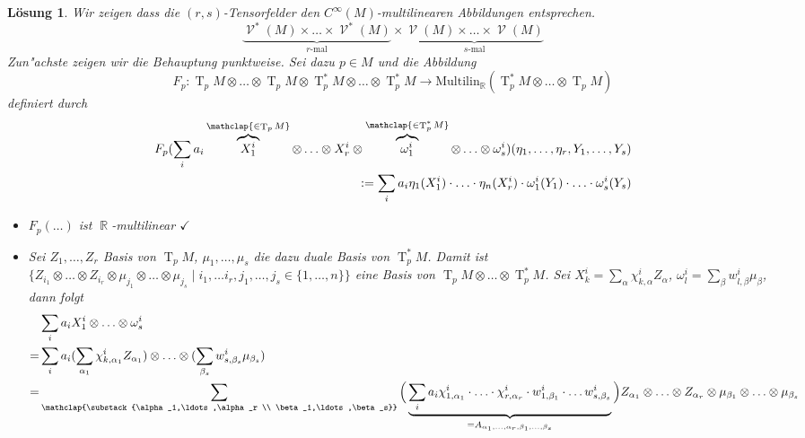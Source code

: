 \documentclass[paper=A4, twoside, chapterprefix=true, bibliography=totoc, headsepline]{scrbook}
\DeclareMathOperator{\R}{\mathbb{R}}
\DeclareMathOperator{\calV}{\mathcal{V}}
\DeclareMathOperator{\T}{T}         %
\newcommand{\X}{\times}
\theoremstyle{plain}
\theoremstyle{nonumberplain}
\theoremstyle{empty}
\theoremstyle{break}
\newtheorem{Loes}{L\"osung}
\begin{document}
\begin{Loes}\label{exc:ueb5-a1}
Wir zeigen dass die $(r,s)$-Tensorfelder den $C^\infty(M)$-multilinearen Abbildungen entsprechen.
	\[ \underbrace{\calV^*(M) \X \ldots \X \calV^*(M)}_{r\text{-mal}} \X \underbrace{\calV(M) \X \ldots \X \calV(M)}_{s\text{-mal}} \]
Zun"achste zeigen wir die Behauptung punktweise. Sei dazu $p \in M$ und die Abbildung
	\[ F_p: \T_pM \otimes \ldots \otimes \T_pM \otimes \T_p^*M \otimes \ldots \otimes \T_p^*M \to \text{Multilin}_{\R}(\T_p^*M \otimes \ldots \otimes \T_pM) \]
definiert durch
\begin{align*}
	F_p(\sum_i a_i \overbrace{X_1^{i}}^{\mathclap{\in \T_pM}} \otimes \ldots \otimes X_r^{i} \otimes \overbrace{\omega_1^{i}}^{\mathclap{\in \T_p^*M}} \otimes \ldots \otimes \omega_s^{i})(\eta_1,\ldots ,\eta_r, Y_1, \ldots ,Y_s)\\
	\qquad := \sum_i a_i \eta_1(X_1^{i}) \cdot \ldots \cdot \eta_n(X_r^{i}) \cdot \omega_1^{i}(Y_1) \cdot \ldots \cdot \omega_s^{i}(Y_s)
\end{align*}
\begin{description}[leftmargin=*]
\item[$\bm{F_p}$ ist wohldefiniert:]
	\begin{itemize}[leftmargin=*]
		\item
			$F_p(\ldots)$ ist $\R$-multilinear $\checkmark$
		\item
			Sei $Z_1,\ldots ,Z_r$ Basis von $\T_pM$, $\mu_1,\ldots ,\mu_s$ die dazu duale Basis von $\T_p^*M$. Damit ist $\{Z_{i_1} \otimes \ldots \otimes Z_{i_r} \otimes \mu_{j_1} \otimes \ldots \otimes \mu_{j_s} \mid i_1, \ldots i_r, j_1, \ldots , j_s \in \{1,\ldots ,n\}\}$ eine Basis von $\T_pM \otimes \ldots \otimes \T_p^*M$. Sei $X_k^{i} = \sum_\alpha \chi_{k, \alpha}^{i} Z_\alpha$, $\omega_l^{i} = \sum_\beta w_{l, \beta}^{i} \mu_\beta$, dann folgt
			\begin{align*}
				& \sum_i a_i X_1^{i} \otimes \ldots \otimes \omega_s^{i}\\
				=& \sum_i a_i (\sum_{\alpha_1} \chi_{k, \alpha_1}^{i} Z_{\alpha_1}) \otimes \ldots  \otimes (\sum_{\beta_s} w_{s, \beta_s}^{i} \mu_{\beta_s})\\
				=& \sum_{\mathclap{\substack{\alpha_1,\ldots ,\alpha_r \\ \beta_1,\ldots ,\beta_s}}} \Big( \underbrace{\sum_i a_i \chi_{1,\alpha_1}^{i} \cdot \ldots \cdot \chi_{r,\alpha_r}^{i} \cdot w_{1, \beta_1}^{i} \cdot \ldots w_{s, \beta_s}^{i} }_{= A_{\alpha_1,\ldots , \alpha_r, \beta_1, \ldots ,\beta_s}} \Big) Z_{\alpha_1} \otimes \ldots \otimes Z_{\alpha_r} \otimes \mu_{\beta_1} \otimes \ldots \otimes \mu_{\beta_s}

\end{align*}
\end{itemize}
\end{description}
\end{Loes}
\end{document}
